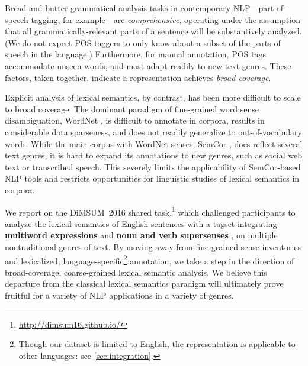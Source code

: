 \documentclass[11pt,letterpaper]{article}
\newcommand{\ensuretext}[1]{#1}
\newcommand{\nssmarker}{\ensuretext{\textcolor{magenta}{\ensuremath{^{\textsc{NS}}_{\textsc{S}}}}}}
\newcommand{\arkcomment}[3]{\ensuretext{\textcolor{#3}{[#1 #2]}}}
\newcommand{\nss}[1]{\arkcomment{\nssmarker}{#1}{magenta}}
\newcommand{\finalversion}[1]{}
\begin{document}
Bread-and-butter grammatical analysis tasks in contemporary NLP---part-of-speech tagging, for example---are \emph{comprehensive}, 
operating under the assumption that all grammatically-relevant parts of a sentence  
will be substantively analyzed. (We do not expect POS taggers to only know about a subset of the parts of speech in the language.) 
Furthermore, for manual annotation, 
POS tags accommodate unseen words, and most adapt readily to new text genres.
These factors, taken together, indicate a representation achieves \emph{broad coverage}. 

Explicit analysis of lexical semantics, by contrast, has been more difficult to scale 
to broad coverage.
The dominant paradigm of fine-grained word sense disambiguation, WordNet \citep{wordnet}, 
is difficult to annotate in corpora, results in considerable data sparseness, 
and does not readily generalize to out-of-vocabulary words.
While the main corpus with WordNet senses, 
SemCor \citep{semcor}, does reflect several text genres, it is hard
to expand its annotations to new genres, such as social web text 
or transcribed speech.
This severely limits the applicability of SemCor-based NLP tools 
and restricts opportunities for linguistic studies of lexical semantics in corpora.

\finalversion{\nss{do we want to say something about insights from MT? this needs work:}
Consequently,  \citet{carpuat-05,resnik-06} found that traditional, fine-grained word sense disambiguation 
did indeed \emph{not} improve machine translation. 
\nss{TODO}However, abstracting the senses and moving to multi-word does \citep{chan-07,carpuat-07,lefever-10}.
}


We report on the DiMSUM~2016 shared task,\footnote{\url{http://dimsum16.github.io/}} which challenged participants to analyze the lexical semantics 
of English sentences with a tagset integrating
\textbf{multiword expressions} and \textbf{noun and verb supersenses} \citep[following][]{schneider-15}, 
on multiple nontraditional genres of text. 
By moving away from fine-grained sense inventories and lexicalized, language-specific\footnote{Though our dataset is limited to English, the representation is applicable to other languages: see \cref{sec:integration}.} annotation,
we take a step in the direction of broad-coverage, coarse-grained lexical semantic analysis. 
We believe this departure from the classical lexical semantics paradigm 
will ultimately prove fruitful for a variety of NLP applications in a variety of genres. 
\end{document}

